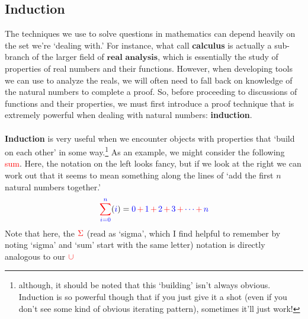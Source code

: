 \documentclass[10pt]{article}
\theoremstyle{definition}
\begin{document}
\subsection{Induction}
The techniques we use to solve questions in mathematics can depend
heavily on the set we're `dealing with.'  For instance, what call
\textbf{calculus} is actually a sub-branch of the larger field of
$\textbf{real analysis}$, which is essentially the study of properties
of real numbers and their functions.  However, when developing tools
we can use to analyze the reals, we will often need to fall back on
knowledge of the natural numbers to complete a proof.  So, before
proceeding to discussions of functions and their properties, we must
first introduce a proof technique that is extremely powerful when
dealing with natural numbers: \textbf{induction}.\\~\\
\textbf{Induction} is very useful when we encounter objects with
properties that `build on each other' in some way.\footnote{although,
  it should be noted that this `building' isn't always obvious.
  Induction is so powerful though that if you just give it a shot
  (even if you don't see some kind of obvious iterating pattern),
  sometimes it'll just work!}  As an example, we might consider the
following \textcolor{red}{sum}.  Here, the notation on the left looks
fancy, but if we look at the right we can work out that it seems to
mean something along the lines of `add the first $n$ natural numbers
together.'  %
\[{\color{red}\sum^{{\color{blue}n}}_{\color{blue} i=0}}
  ({\color{blue}i}) = \textcolor{blue}{0}
  \,{\color{red}+}\,\textcolor{blue}{1} \,{\color{red}+}\,
  \textcolor{blue}{2} \,{\color{red}+}\, \textcolor{blue}{3}
  \,{\color{red}+}\, \textcolor{blue}{\cdots} \,{\color{red}+}\,
  \textcolor{blue}{n}\]
Note that here, the $\color{red}\Sigma$ (read as `sigma', which I find
helpful to remember by noting `sigma' and `sum' start with the same
letter) notation is directly analogous to our $\color{red}\cup$
\end{document}
